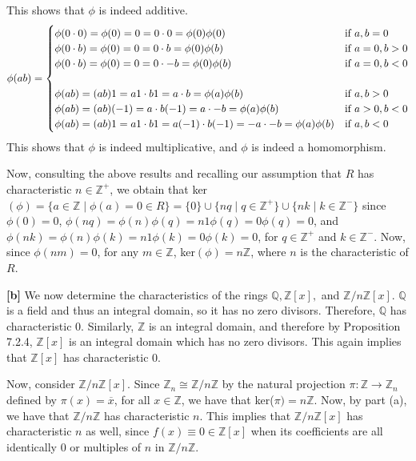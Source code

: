 This shows that $\phi$ is indeed additive.
\[
\phi(ab) =
\begin{cases}
    \phi(0\cdot0) = \phi(0) = 0 = 0\cdot0 = \phi(0)\phi(0) & \textnormal{if } a,b = 0 \\
    \phi(0\cdot b) = \phi(0) = 0 = 0\cdot b = \phi(0)\phi(b) & \textnormal{if } a = 0, b > 0 \\
    \phi(0\cdot b) = \phi(0) = 0 = 0\cdot-b = \phi(0)\phi(b) & \textnormal{if } a = 0, b < 0 \\
    \\
    \phi(ab) = (ab)1 = a1\cdot b1 = a\cdot b = \phi(a)\phi(b) & \textnormal{if } a,b > 0 \\
    \phi(ab) = (ab)(-1) = a\cdot b(-1) = a \cdot -b = \phi(a)\phi(b) & \textnormal{if } a > 0, b < 0 \\
    \phi(ab) = (ab)1 = a1\cdot b1 = a(-1) \cdot b(-1) = -a\cdot -b = \phi(a)\phi(b) & \textnormal{if } a,b < 0
\end{cases}
\]
This shows that $\phi$ is indeed multiplicative, and $\phi$ is indeed a homomorphism. 

Now, consulting the above results and recalling our assumption that $R$ has characteristic $n \in \mathbb{Z}^+$, we obtain that ker$(\phi) = \{ a \in \mathbb{Z} \mid \phi(a) = 0 \in R\} = \{0\} \cup \{nq \mid q \in \mathbb{Z}^+\} \cup \{nk \mid k \in \mathbb{Z}^-\}$ since $\phi(0) = 0$, $\phi(nq) = \phi(n)\phi(q) = n1\phi(q) = 0\phi(q) = 0$, and $\phi(nk) = \phi(n)\phi(k) = n1\phi(k) = 0\phi(k) = 0$, for $q \in \mathbb{Z}^+$ and $k \in \mathbb{Z}^-$. Now, since $\phi(nm) = 0$, for any $m \in \mathbb{Z}$, ker$(\phi) = n\mathbb{Z}$, where $n$ is the characteristic of $R$.

\vspace{3 mm}

\textbf{[b]} We now determine the characteristics of the rings $\mathbb{Q}, \mathbb{Z}[x],$ and $ \mathbb{Z}/n\mathbb{Z}[x]$. $\mathbb{Q}$ is a field and thus an integral domain, so it has no zero divisors. Therefore, $\mathbb{Q}$ has characteristic 0. Similarly, $\mathbb{Z}$ is an integral domain, and therefore by Proposition 7.2.4, $\mathbb{Z}[x]$ is an integral domain which has no zero divisors. This again implies that $\mathbb{Z}[x]$ has characteristic 0.

Now, consider $\mathbb{Z}/n\mathbb{Z}[x]$. Since $\mathbb{Z}_n \cong \mathbb{Z}/n\mathbb{Z}$ by the natural projection $\pi: \mathbb{Z} \rightarrow \mathbb{Z}_n$ defined by $\pi(x) = \overline{x}$, for all $x \in \mathbb{Z}$, we have that ker($\pi) = n\mathbb{Z}$. Now, by part (a), we have that $\mathbb{Z}/n\mathbb{Z}$ has characteristic $n$. This implies that $\mathbb{Z}/n\mathbb{Z}[x]$ has characteristic $n$ as well, since $f(x) \equiv 0 \in \mathbb{Z}[x]$ when its coefficients are all identically 0 or multiples of $n$ in $\mathbb{Z}/n\mathbb{Z}$.

